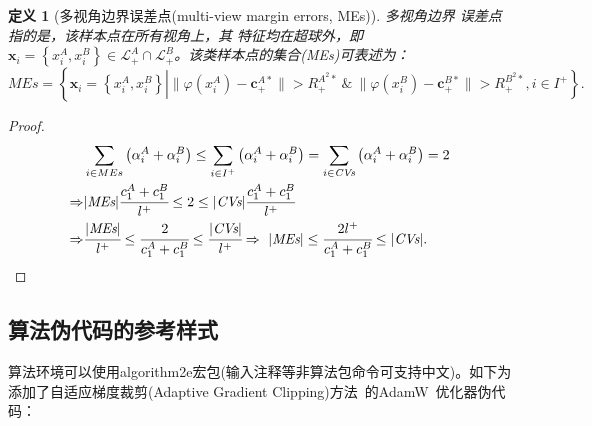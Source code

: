 \documentclass[twoside,zihao=-4,UTF8]{bjfu}
\begin{document}
\newtheorem{definition}{定义}
\begin{definition}[多视角边界误差点(multi-view margin errors, MEs)] 多视角边界
误差点指的是，该样本点在所有视角上，其
特征均在超球外，即$\boldsymbol{x}_{i} = \left\{x_{i}^{A},x_{i}^{B}\right\} \in 
\mathcal{L}_{+}^{A} \cap \mathcal{L}_{+}^{B}$。该类样本点的集合(MEs)可表述为：
	\begin{equation}
		\textit{MEs} = \left\{\boldsymbol{x}_{i} = 
		\left\{x_{i}^{A},x_{i}^{B}\right\} \left| 
		\|\varphi(x_{i}^{A}) - \boldsymbol{c}_{+}^{A*}\| > R_{+}^{A^2*} \ 
		\& \ 
		\|\varphi(x_{i}^{B}) - \boldsymbol{c}_{+}^{B*}\| > R_{+}^{B^2*} \right. 
		, i \in I^{+}
		\right\}.
	\end{equation}
\end{definition}

\begin{proof}
	\begin{align}
		&\sum\limits_{i\in {{MEs}}}{\left( \alpha_{i}^{A}+\alpha _{i}^{B} 
			\right)} \le \sum\limits_{i\in {{I}^{+}}}{\left( 
			\alpha_{i}^{A}+\alpha _{i}^{B} 
		\right)}=\sum\limits_{i\in {\textit{CVs}}}{\left( \alpha_{i}^{A}+\alpha 
		_{i}^{B} \right)}=2 \nonumber \\
		\Rightarrow & |\textit{MEs}|\cfrac{c_{1}^{A}+c_{1}^{B}}{l^{+}} \le 2 
		\le 
		|\textit{CVs}|\cfrac{c_{1}^{A}+c_{1}^{B}}{l^{+}} \nonumber \\
		\Rightarrow & \cfrac{|\textit{MEs}|}{l^{+}} \le 
		\cfrac{2}{c_{1}^{A}+c_{1}^{B}} \le 
		\cfrac{|\textit{CVs}|}{l^{+}} \Rightarrow \ {|\textit{MEs}|} \le 
		\cfrac{2{l^{+}}}{c_{1}^{A}+c_{1}^{B}} \le 
		{|\textit{CVs}|} .\nonumber
	\end{align}
\end{proof}


\subsection{算法伪代码的参考样式}
算法环境可以使用algorithm2e宏包(输入注释等非算法包命令可支持中文)。如下为添加了自适应梯度裁剪(Adaptive Gradient Clipping)方法~\cite{brock2021high}的AdamW~\cite{loshchilov2017decoupled}优化器伪代码：
\end{document}

